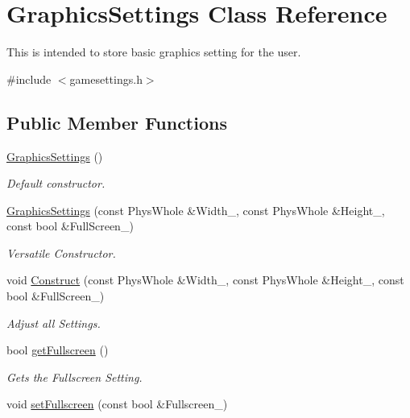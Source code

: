 \hypertarget{classGraphicsSettings}{
\section{GraphicsSettings Class Reference}
\label{de/de6/classGraphicsSettings}
}


This is intended to store basic graphics setting for the user.  


{\ttfamily \#include $<$gamesettings.h$>$}\subsection*{Public Member Functions}
\begin{DoxyCompactItemize}
\item 
\hyperlink{classGraphicsSettings_a3c5fd3428c4a0549bfa5d5f3b1915c34}{GraphicsSettings} ()
\begin{DoxyCompactList}\small\item\em Default constructor. \item\end{DoxyCompactList}\item 
\hyperlink{classGraphicsSettings_ac95d6a9fd22cbf44ad70bd34f8229294}{GraphicsSettings} (const PhysWhole \&Width\_\-, const PhysWhole \&Height\_\-, const bool \&FullScreen\_\-)
\begin{DoxyCompactList}\small\item\em Versatile Constructor. \item\end{DoxyCompactList}\item 
void \hyperlink{classGraphicsSettings_afd15d9badf37bb54c55e0667b3061c37}{Construct} (const PhysWhole \&Width\_\-, const PhysWhole \&Height\_\-, const bool \&FullScreen\_\-)
\begin{DoxyCompactList}\small\item\em Adjust all Settings. \item\end{DoxyCompactList}\item 
bool \hyperlink{classGraphicsSettings_a4293e8643a4ed575f682636e748782d1}{getFullscreen} ()
\begin{DoxyCompactList}\small\item\em Gets the Fullscreen Setting. \item\end{DoxyCompactList}\item 
void \hyperlink{classGraphicsSettings_a7f4e3b1215e6be27010ad2a57c720178}{setFullscreen} (const bool \&Fullscreen\_\-)

\end{DoxyCompactItemize}
